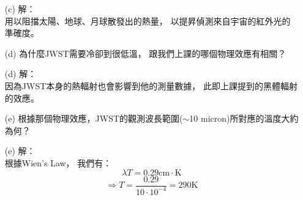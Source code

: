 \documentclass{article}
\theoremstyle{definition}
\begin{document}
\begin{enumerate}
\begin{enumerate}
			\item[(c)] 解：\\
				用以阻擋太陽、地球、月球散發出的熱量，
				以提昇偵測來自宇宙的紅外光的準確度。

			\item[(d)] 為什麼JWST需要冷卻到很低溫，
				跟我們上課的哪個物理效應有相關？

			\item[(d)] 解：\\
				因為JWST本身的熱輻射也會影響到他的測量數據，
				此即上課提到的黑體輻射的效應。

			\item[(e)] 根據那個物理效應，JWST的觀測波長範圍($\sim$10 micron)所對應的溫度大約為何？

			\item[(e)] 解：\\
				根據Wien's Law，
				我們有：
				\[
					\lambda T = 0.29 \text{cm} \cdot \text{K}
				\]
				\[
					\Rightarrow T = \frac{0.29}{10 \cdot 10^{-4}} = 290 \text{K}
				\]
		\end{enumerate}


\end{enumerate}
\end{document}
